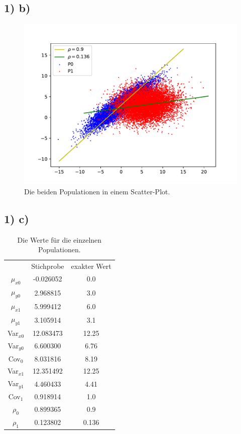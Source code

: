 \subsection*{1) b)}
\begin{figure}[H]
  \includegraphics[width=\linewidth]{Python/Aufgabe1b.pdf}
  \caption{Die beiden Populationen in einem Scatter-Plot.}
\end{figure}


\subsection*{1) c)}

\begin{table}[H]
  \centering
  \begin{tabular}{c c c}
    & Stichprobe & exakter Wert \\
    $\mu_{x0}$ & -0.026052 & 0.0 \\
    $\mu_{y0}$ & 2.968815 & 3.0 \\
    $\mu_{x1}$ & 5.999412 & 6.0 \\
    $\mu_{y1}$ & 3.105914 & 3.1 \\
    Var$_{x0}$ & 12.083473 & 12.25\\
    Var$_{y0}$ & 6.600300 & 6.76 \\
    Cov$_0$ & 8.031816 & 8.19 \\
    Var$_{x1}$ & 12.351492 & 12.25 \\
    Var$_{y1}$ & 4.460433 & 4.41 \\
    Cov$_1$ & 0.918914 & 1.0 \\
    $\rho_0$ & 0.899365 & 0.9 \\
    $\rho_1$ & 0.123802 & 0.136 \\
  \end{tabular}
  \caption{Die Werte für die einzelnen Populationen.}
\end{table}

